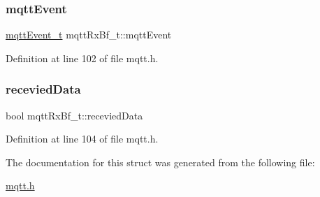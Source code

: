 \mbox{\label{structmqttRxBf__t_af14afe6989fa691721b612eb6aea9a87}} 
\subsubsection{\texorpdfstring{mqtt\+Event}{mqttEvent}}
{\footnotesize\ttfamily \hyperlink{mqtt_8h_addc2504b9e66d98288c510964264c855}{mqtt\+Event\+\_\+t} mqtt\+Rx\+Bf\+\_\+t\+::mqtt\+Event}



Definition at line 102 of file mqtt.\+h.

\mbox{\label{structmqttRxBf__t_ab9e321c2fedce83b4720d93b5eeaacc7}} 
\subsubsection{\texorpdfstring{recevied\+Data}{receviedData}}
{\footnotesize\ttfamily bool mqtt\+Rx\+Bf\+\_\+t\+::recevied\+Data}



Definition at line 104 of file mqtt.\+h.



The documentation for this struct was generated from the following file\+:\begin{DoxyCompactItemize}
\item 
\hyperlink{mqtt_8h}{mqtt.\+h}\end{DoxyCompactItemize}
